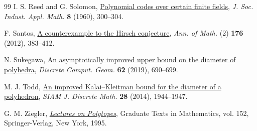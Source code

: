 \begin{thebibliography}{99}
I. S. Reed and G. Solomon,
\href{https://doi.org/10.1137/0108018}{Polynomial codes over certain finite fields},
\emph{J. Soc. Indust. Appl. Math.} \textbf{8} (1960), 300--304.

F. Santos,
\href{https://doi.org/10.4007/annals.2012.176.1.7}{A counterexample to the Hirsch conjecture},
\emph{Ann. of Math.} (2) \textbf{176} (2012), 383--412.

N. Sukegawa,
\href{https://doi.org/10.1007/s00454-018-0016-y}{An asymptotically improved upper bound on the diameter of polyhedra},
\emph{Discrete Comput. Geom.} \textbf{62} (2019), 690--699.

M. J. Todd,
\href{https://doi.org/10.1137/140962310}{An improved Kalai--Kleitman bound for the diameter of a polyhedron},
\emph{SIAM J. Discrete Math.} \textbf{28} (2014), 1944--1947.

G. M. Ziegler,
\emph{\href{https://doi.org/10.1007/978-1-4613-8431-1}{Lectures on Polytopes}},
Graduate Texts in Mathematics, vol. 152, Springer-Verlag, New York, 1995.

\end{thebibliography}
